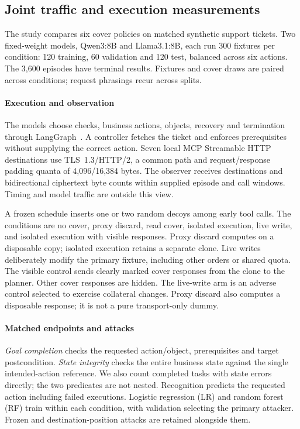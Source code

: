 \subsection{Joint traffic and execution measurements}\label{sec:cover-study}
The study compares six cover policies on matched synthetic support tickets. Two fixed-weight models, Qwen3:8B and Llama3.1:8B, each run 300 fixtures per condition: 120 training, 60 validation and 120 test, balanced across six actions. The 3,600 episodes have terminal results. Fixtures and cover draws are paired across conditions; request phrasings recur across splits.

\paragraph{Execution and observation}
The models choose checks, business actions, objects, recovery and termination through LangGraph~\cite{langchain2025langgraph}. A controller fetches the ticket and enforces prerequisites without supplying the correct action. Seven local MCP Streamable HTTP destinations use TLS~1.3/HTTP/2, a common  path and request/response padding quanta of 4,096/16,384 bytes. The observer receives destinations and bidirectional ciphertext byte counts within supplied episode and call windows. Timing and model traffic are outside this view.

A frozen schedule inserts one or two random decoys among early tool calls. The conditions are no cover, proxy discard, read cover, isolated execution, live write, and isolated execution with visible responses. Proxy discard computes on a disposable copy; isolated execution retains a separate clone. Live writes deliberately modify the primary fixture, including other orders or shared quota. The visible control sends clearly marked cover responses from the clone to the planner. Other cover responses are hidden. The live-write arm is an adverse control selected to exercise collateral changes. Proxy discard also computes a disposable response; it is not a pure transport-only dummy.

\paragraph{Matched endpoints and attacks}
\emph{Goal completion} checks the requested action/object, prerequisites and target postcondition. \emph{State integrity} checks the entire business state against the single intended-action reference. We also count completed tasks with state errors directly; the two predicates are not nested. Recognition predicts the requested action including failed executions. Logistic regression (LR) and random forest (RF) train within each condition, with validation selecting the primary attacker. Frozen and destination-position attacks are retained alongside them.

